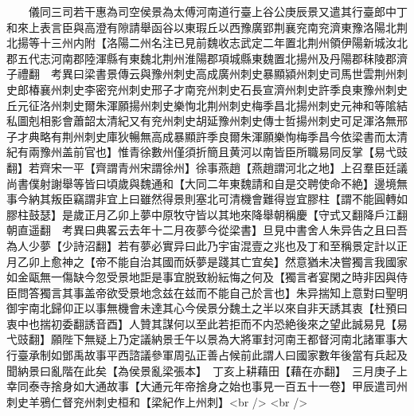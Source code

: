 　　儀同三司若干惠為司空侯景為太傅河南道行臺上谷公庚辰景又遣其行臺郎中丁和來上表言臣與高澄有隙請舉函谷以東瑕丘以西豫廣郢荆襄兖南兖濟東豫洛陽北荆北揚等十三州内附【洛陽二州名注已見前魏收志武定二年置北荆州領伊陽新城汝北郡五代志河南郡陸渾縣有東魏北荆州淮陽郡項城縣東魏置北揚州及丹陽郡秣陵郡濟子禮翻　考異曰梁書景傳云與豫州刺史高成廣州刺史暴顯潁州刺史司馬世雲荆州刺史郎椿襄州刺史李密兖州刺史邢子才南兖州刺史石長宣濟州刺史許季良東豫州刺史丘元征洛州刺史爾朱渾願揚州刺史樂恂北荆州刺史梅季昌北揚州刺史元神和等隂結私圖剋相影會蕭韶太清紀又有兖州刺史胡延豫州刺史傳士哲揚州刺史可足渾洛無邢子才典略有荆州刺史庫狄暢無高成暴顯許季良爾朱渾願樂恂梅季昌今依梁書而太清紀有兩豫州盖前官也】惟青徐數州僅須折簡且黄河以南皆臣所職易同反掌【易弋豉翻】若齊宋一平【齊謂青州宋謂徐州】徐事燕趙【燕趙謂河北之地】上召羣臣廷議尚書僕射謝舉等皆曰頃歲與魏通和【大同二年東魏請和自是交聘使命不絶】邊境無事今納其叛臣竊謂非宜上曰雖然得景則塞北可清機會難得豈宜膠柱【謂不能圓轉如膠柱鼓瑟】是歲正月乙卯上夢中原牧守皆以其地來降舉朝稱慶【守式又翻降戶江翻朝直遥翻　考異曰典畧云去年十二月夜夢今從梁書】旦見中書舍人朱异告之且曰吾為人少夢【少詩沼翻】若有夢必實异曰此乃宇宙混壹之兆也及丁和至稱景定計以正月乙卯上愈神之【帝不能自治其國而妖夢是踐其亡宜矣】然意猶未决嘗獨言我國家如金甌無一傷缺今忽受景地詎是事宜脱致紛紜悔之何及【獨言者宴閑之時非因與侍臣問答獨言其事盖帝欲受景地念兹在兹而不能自己於言也】朱异揣知上意對曰聖明御宇南北歸仰正以事無機會未達其心今侯景分魏土之半以來自非天誘其衷【杜預曰衷中也揣初委翻誘音酉】人贊其謀何以至此若拒而不内恐絶後來之望此誠易見【易弋豉翻】願陛下無疑上乃定議納景壬午以景為大將軍封河南王都督河南北諸軍事大行臺承制如鄧禹故事平西諮議參軍周弘正善占候前此謂人曰國家數年後當有兵起及聞納景曰亂階在此矣【為侯景亂梁張本】　丁亥上耕藉田【藉在亦翻】　三月庚子上幸同泰寺捨身如大通故事【大通元年帝捨身之始也事見一百五十一卷】甲辰遣司州刺史羊鴉仁督兖州刺史桓和【梁紀作上州刺】<br />
<br />
